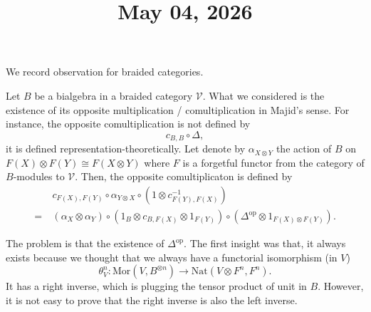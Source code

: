 \documentclass[11pt]{amsart}
\title{May 04, 2026}
\begin{document}
\maketitle

We record observation for braided categories.

Let $B$ be a bialgebra in a braided category $\mathcal{V}$.
What we considered is the existence of its opposite multiplication / comultiplication in Majid's sense.
For instance, the opposite comultiplication is not defined by
\[
c_{B, B} \circ \Delta,
\]
it is defined representation-theoretically.
Let denote by $\alpha_{X \otimes Y}$ the action of $B$ on $F(X) \otimes F(Y) \cong F(X \otimes Y)$ where $F$ is a forgetful functor from the category of $B$-modules to $\mathcal{V}$.
Then, the opposite comultiplicaton is defined by
\begin{align*}
    & c_{F(X), F(Y)} \circ \alpha_{Y \otimes X} \circ (1 \otimes c_{F(Y), F(X)}^{-1}) \\
    =\ & (\alpha_X \otimes \alpha_Y) \circ (1_B \otimes c_{B, F(X)} \otimes 1_{F(Y)}) \circ (\Delta^{\mathrm{op}} \otimes 1_{F(X) \otimes F(Y)}).
\end{align*}

The problem is that the existence of $\Delta^{\mathrm{op}}$.
The first insight was that, it always exists because we thought that we always have a functorial isomorphism (in $V$)
\[
\theta^n_V : \mathrm{Mor}(V, B^{\otimes n}) \longrightarrow \mathrm{Nat}(V \otimes F^n, F^n).
\]
It has a right inverse, which is plugging the tensor product of unit in $B$.
However, it is not easy to prove that the right inverse is also the left inverse.




\end{document}
